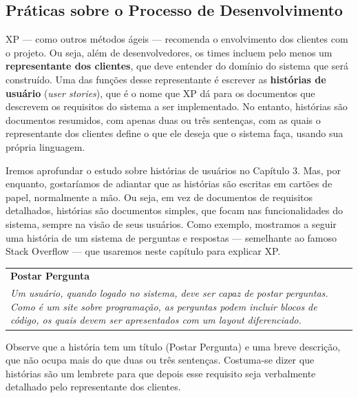 \documentclass[
  11pt,
  twoside]{book}
\begin{document}
\hypertarget{pruxe1ticas-sobre-o-processo-de-desenvolvimento}{%
\subsection{Práticas sobre o Processo de
Desenvolvimento}\label{pruxe1ticas-sobre-o-processo-de-desenvolvimento}}

 XP --- como outros métodos ágeis ---
recomenda o envolvimento dos clientes com o projeto. Ou seja, além de
desenvolvedores, os times incluem pelo menos um \textbf{representante
dos clientes}, que deve entender do domínio do sistema que será
construído. Uma das funções desse representante é escrever as
\textbf{histórias de usuário} (\emph{user stories}), que é o nome que XP
dá para os documentos que descrevem os requisitos do sistema a ser
implementado. No entanto, histórias são documentos resumidos, com apenas
duas ou três sentenças, com as quais o representante dos clientes define
o que ele deseja que o sistema faça, usando sua própria linguagem.

Iremos aprofundar o estudo sobre histórias de usuários no Capítulo 3.
Mas, por enquanto, gostaríamos de adiantar que as histórias são escritas
em cartões de papel, normalmente a mão. Ou seja, em vez de documentos de
requisitos detalhados, histórias são documentos simples, que focam nas
funcionalidades do sistema, sempre na visão de seus usuários. Como
exemplo, mostramos a seguir uma história de um sistema de perguntas e
respostas --- semelhante ao famoso Stack Overflow --- que usaremos neste
capítulo para explicar XP.

\begin{longtable}[]{@{}l@{}}
\toprule
\endhead
\begin{minipage}[t]{0.88\columnwidth}\raggedright
\textbf{Postar Pergunta}\strut
\end{minipage}\tabularnewline
\begin{minipage}[t]{0.88\columnwidth}\raggedright
\emph{Um usuário, quando logado no sistema, deve ser capaz de postar
perguntas. Como é um site sobre programação, as perguntas podem incluir
blocos de código, os quais devem ser apresentados com um layout
diferenciado.}\strut
\end{minipage}\tabularnewline
\bottomrule
\end{longtable}

Observe que a história tem um título (Postar Pergunta) e uma breve
descrição, que não ocupa mais do que duas ou três sentenças. Costuma-se
dizer que histórias são um lembrete para que depois esse requisito seja
verbalmente detalhado pelo representante dos clientes.
\end{document}
